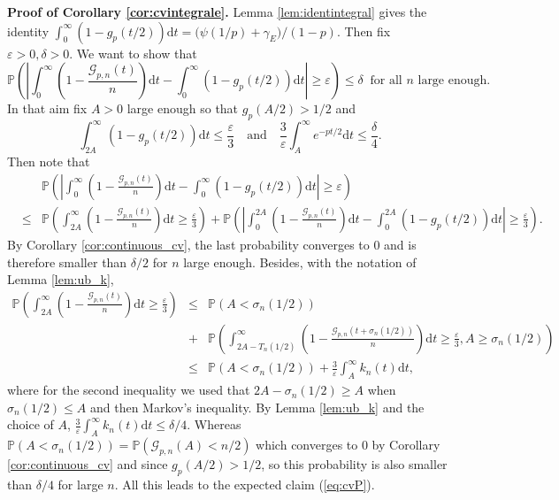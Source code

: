 \documentclass[a4, 11pt]{article}
\numberwithin{equation}{section}
\theoremstyle{plain}
\theoremstyle{definition}
\theoremstyle{remark}
\begin{document}
\textbf{Proof of Corollary \ref{cor:cvintegrale}.} Lemma \ref{lem:identintegral} gives the identity $\int_0^{\infty} \left(1-g_p(t/2)\right) \mathrm dt=\big(\psi(1/p)+\gamma_E\big)/(1-p).$ Then
fix $\varepsilon >0, \delta>0$. We want to show that 
\begin{equation}
\label{eq:cvP}
\mathbb P\left(\left | \int_0^{\infty} \left(1-\frac{\mathcal G_{p,n}(t)}{n}\right) \mathrm dt- \int_0^{\infty} \left(1-g_p(t/2)  \right) \mathrm dt \right| \geq \varepsilon \right) \leq \delta~\text{ for all } n \text{ large enough.}
\end{equation}
In that aim fix $A>0$ large enough so that $g_p(A/2)>1/2$ and
$$
\int_{2A}^{\infty} \left(1-g_p(t/2)\right) \mathrm dt \leq \frac{\varepsilon}{3} \quad \text{and} \quad \frac{3}{\varepsilon} \int_A^{\infty} e^{-pt/2} \mathrm dt \leq \frac{\delta}{4}.
$$
Then note that
\begin{eqnarray*}
&& \mathbb P\left(\left | \int_0^{\infty} \left(1-\frac{\mathcal G_{p,n}(t)}{n}\right) \mathrm dt- \int_0^{\infty} \left(1-g_p(t/2)  \right) \mathrm dt \right| \geq \varepsilon \right) \\
&\leq&  \mathbb P\left( \int_{2A}^{\infty} \left(1-\frac{\mathcal G_{p,n}(t)}{n}\right) \mathrm dt \geq \frac{\varepsilon}{3} \right) 
+ \mathbb P\left(\left | \int_0^{2A} \left(1-\frac{\mathcal G_{p,n}(t)}{n}\right) \mathrm dt- \int_0^{2A} \left(1-g_p(t/2)  \right) \mathrm dt \right| \geq \frac{\varepsilon}{3}\right).
\end{eqnarray*}
By Corollary \ref{cor:continuous_cv}, the last probability converges to 0 and is therefore smaller than $\delta/2$ for $n$ large enough. Besides, with the notation of Lemma  \ref{lem:ub_k}, 
\begin{eqnarray*}
 \mathbb P\left( \int_{2A}^{\infty} \left(1-\frac{\mathcal G_{p,n}(t)}{n}\right) \mathrm dt \geq \frac{\varepsilon}{3} \right) &\leq& \mathbb P\left(A < \sigma_n(1/2)\right) \\
 &+& \mathbb P\left( \int_{2A-T_n(1/2)}^{\infty}\left(1-\frac{\mathcal G_{p,n}(t+\sigma_n(1/2))}{n}\right) \mathrm dt \geq \frac{\varepsilon}{3}, A \geq  \sigma_n(1/2) \right) \\
 &\leq &  \mathbb P\left(A <\sigma_n(1/2)\right) + \frac{3}{\varepsilon} \int_A^{\infty} k_n(t) \mathrm dt,
\end{eqnarray*}
where for the second inequality we used that $2A-\sigma_n(1/2) \geq A$ when $\sigma_n(1/2)\leq A$ and then Markov's inequality. By Lemma \ref{lem:ub_k} and the choice of $A$, $\frac{3}{\varepsilon} \int_A^{\infty} k_n(t) \mathrm dt \leq \delta/4$. Whereas $ \mathbb P\left(A <\sigma_n(1/2)\right)= \mathbb P\left(\mathcal G_{p,n}(A) <n/2\right)$ which converges to 0 by Corollary \ref{cor:continuous_cv} and since $g_p(A/2)>1/2$, so this probability is also smaller than $\delta/4$ for large $n$.  All this leads to the expected claim (\ref{eq:cvP}).
\end{document}
